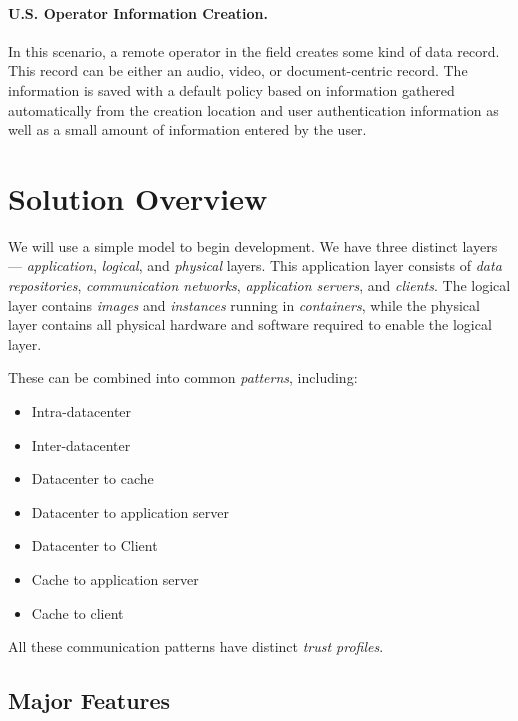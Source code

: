 \documentclass[10pt,letterpaper]{article}
\begin{document}
\paragraph{U.S. Operator Information Creation.} In this scenario, a remote operator in the field creates some kind of data record.  This record can be either an audio, video, or document-centric record.  The information is saved with a default policy based on information gathered automatically from the creation location and user authentication information as well as a small amount of information entered by the user.

\section{Solution Overview}
\label{sec:overview}
We will use a simple model to begin development.  We have three distinct layers --- {\sl application}, {\sl logical}, and {\sl physical} layers. This application layer consists of {\sl data repositories}, {\sl communication networks}, {\sl application servers}, and {\sl clients}.  The logical layer contains {\sl images} and {\sl instances} running in {\sl containers}, while the physical layer contains all physical hardware and software required to enable the logical layer.

These can be combined into common {\sl patterns}, including:
\begin{itemize}
\item Intra-datacenter
\item Inter-datacenter
\item Datacenter to cache
\item Datacenter to application server
\item Datacenter to Client
\item Cache to application server
\item Cache to client
\end{itemize}
All these communication patterns have distinct {\sl trust profiles}.

\subsection{Major Features}
\label{sec:features}
\end{document}
